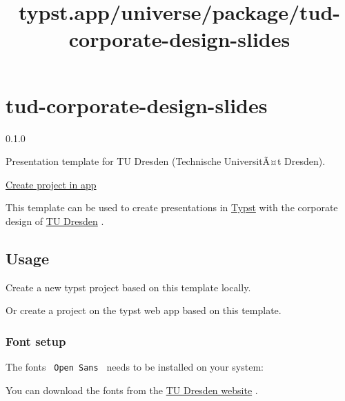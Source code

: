 \title{typst.app/universe/package/tud-corporate-design-slides}

\label{banner}
\label{template-thumbnail}

\section{tud-corporate-design-slides}\label{tud-corporate-design-slides}

{ 0.1.0 }

Presentation template for TU Dresden (Technische UniversitÃ¤t Dresden).

\href{/app?template=tud-corporate-design-slides&version=0.1.0}{Create
project in app}

\label{readme}
This template can be used to create presentations in
\href{https://github.com/typst/typst}{Typst} with the corporate design
of \href{https://www.tu-dresden.de/}{TU Dresden} .

\subsection{Usage}\label{usage}

Create a new typst project based on this template locally.

\begin{Shaded}
\begin{Highlighting}[]
\end{Highlighting}
\end{Shaded}

Or create a project on the typst web app based on this template.

\subsubsection{Font setup}\label{font-setup}

The fonts \texttt{\ Open\ Sans\ } needs to be installed on your system:

You can download the fonts from the
\href{https://tu-dresden.de/intern/services-und-hilfe/ressourcen/dateien/kommunizieren_und_publizieren/corporate-design/cd-elemente/schrift-tud-open-sans}{TU
Dresden website} .

